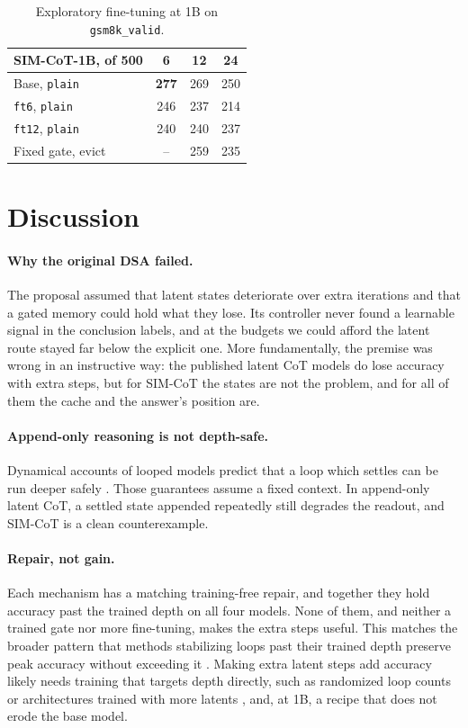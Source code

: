 \documentclass[11pt]{article}
\newcommand{\pol}[1]{\texttt{#1}}
\begin{document}
\begin{table}[t]
\centering
\small
\setlength{\tabcolsep}{4pt}
\begin{tabular}{lccc}
\toprule
SIM-CoT-1B, of 500 & 6 & 12 & 24 \\
\midrule
Base, \pol{plain} & \textbf{277} & 269 & 250 \\
\pol{ft6}, \pol{plain} & 246 & 237 & 214 \\
\pol{ft12}, \pol{plain} & 240 & 240 & 237 \\
Fixed gate, evict & -- & 259 & 235 \\
\bottomrule
\end{tabular}
\caption{Exploratory fine-tuning at 1B on \texttt{gsm8k\_valid}.}
\label{tab:partc}
\end{table}

\section{Discussion}
\label{sec:discussion}

\paragraph{Why the original DSA failed.} The proposal assumed that latent states deteriorate over extra iterations and that
a gated memory could hold what they lose. Its controller never found a learnable signal in the conclusion labels, and at the
budgets we could afford the latent route stayed far below the explicit one. More fundamentally, the premise was wrong in an
instructive way: the published latent CoT models do lose accuracy with extra steps, but for SIM-CoT the states are not the
problem, and for all of them the cache and the answer's position are.

\paragraph{Append-only reasoning is not depth-safe.} Dynamical accounts of looped models predict that a loop which settles
can be run deeper safely \citep{viakhirev2026thinkshallow, blayney2026mechanistic}. Those guarantees assume a fixed
context. In append-only latent CoT, a settled state appended repeatedly still degrades the readout, and SIM-CoT is a clean
counterexample.

\paragraph{Repair, not gain.} Each mechanism has a matching training-free repair, and together they hold accuracy past the
trained depth on all four models. None of them, and neither a trained gate nor more fine-tuning, makes the extra steps
useful. This matches the broader pattern that methods stabilizing loops past their trained depth preserve peak accuracy
without exceeding it \citep{viakhirev2026thinkshallow}. Making extra latent steps add accuracy likely needs training that
targets depth directly, such as randomized loop counts \citep{kuo2026stabilizing} or architectures trained with more latents
\citep{wu2025pccot}, and, at 1B, a recipe that does not erode the base model.
\end{document}
